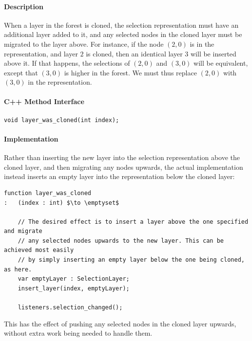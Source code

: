 \paragraph{Description}

When a layer in the forest is cloned, the selection representation must have an additional layer added to it, and any selected nodes in the cloned layer must be migrated to the layer above. For instance, if the node $(2,0)$ is in the representation, and layer $2$ is cloned, then an identical layer $3$ will be inserted above it. If that happens, the selections of $(2,0)$ and $(3,0)$ will be equivalent, except that $(3,0)$ is higher in the forest. We must thus replace $(2,0)$ with $(3,0)$ in the representation.

\paragraph{C++ Method Interface}

\begin{lstlisting}[style=Prototype]
void layer_was_cloned(int index);
\end{lstlisting}

\paragraph{Implementation}

Rather than inserting the new layer into the selection representation above the cloned layer, and then migrating any nodes upwards, the actual implementation instead inserts an empty layer into the representation below the cloned layer:

\begin{lstlisting}[style=Default]
function layer_was_cloned
:	(index : int) $\to \emptyset$

	// The desired effect is to insert a layer above the one specified and migrate
	// any selected nodes upwards to the new layer. This can be achieved most easily
	// by simply inserting an empty layer below the one being cloned, as here.
	var emptyLayer : SelectionLayer;
	insert_layer(index, emptyLayer);

	listeners.selection_changed();
\end{lstlisting}

\noindent This has the effect of pushing any selected nodes in the cloned layer upwards, without extra work being needed to handle them.

\newpage

